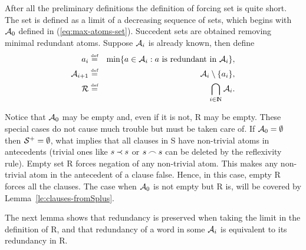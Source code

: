 After all the preliminary definitions the definition of forcing set is quite
short. The set is defined as a limit of a decreasing sequence of sets, which
begins with $\mbox{$\cal A$}_0$ defined in (\ref{eq:max-atoms-set}). Succedent sets are
obtained removing minimal redundant atoms. Suppose $\mbox{$\cal A$}_i$ is already known,
then define
\begin{eqnarray}
a_i & \mathrel{\stackrel{\mbox{\tiny def}}{=}} & \min\{a\in \mbox{$\cal A$}_i:a \mbox{ is redundant in }\mbox{$\cal A$}_i\},
                                      \label{eq:minimal-redundan}\\ 
\mbox{$\cal A$}_{i+1} & \mathrel{\stackrel{\mbox{\tiny def}}{=}} & \mbox{$\cal A$}_i \setminus \{a_i\}, \label{eq:next-aproximation}\\
\mbox{$\cal R$} & \mathrel{\stackrel{\mbox{\tiny def}}{=}} & \bigcap_{i\in {{\rm I\hspace{-.2em}N}}} \mbox{$\cal A$}_i. \label{eq:atoms-model}
\end{eqnarray}

Notice that $\mbox{$\cal A$}_0$ may be empty and, even if it is not, \C R may be empty.
These special cases do not cause much trouble but must be taken care of. If
\(\mbox{$\cal A$}_0 = \emptyset\) then \({\cal S}^{+} = \emptyset\), what implies that all clauses in \C S
have non-trivial atoms in antecedents (trivial ones like \(s\mathbin{\prec} s\) or
\(s\mathbin{\frown} s\) can be deleted by the reflexivity rule). Empty set \C R forces
negation of any non-trivial atom. This makes any non-trivial atom in the
antecedent of a clause false. Hence, in this case, empty \C R forces all the
clauses. The case when $\mbox{$\cal A$}_0$ is not empty but \C R is, will be covered by
Lemma~\ref {le:clauses-fromSplus}.

The next lemma shows that redundancy
is preserved when taking the limit in the definition of \C R, 
and that redundancy of a word in some \(\mbox{$\cal A$}_i\) is equivalent
to its redundancy in  \C R.

